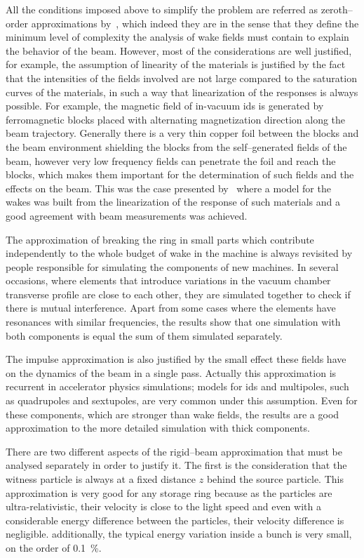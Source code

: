     All the conditions imposed above to simplify the problem are referred as zeroth--order approximations by~, which indeed they are in the sense that they define the minimum level of complexity the analysis of wake fields must contain to explain the behavior of the beam. However, most of the considerations are well justified, for example, the assumption of linearity of the materials is justified by the fact that the intensities of the fields involved are not large compared to the saturation curves of the materials, in such a way that linearization of the responses is always possible. For example, the magnetic field of in-vacuum \glspl{id} is generated by ferromagnetic blocks placed with alternating magnetization direction along the beam trajectory. Generally there is a very thin copper foil between the blocks and the beam environment shielding the blocks from the self--generated fields of the beam, however very low frequency fields can penetrate the foil and reach the blocks, which makes them important for the determination of such fields and the effects on the beam. This was the case presented by~ where a model for the wakes was built from the linearization of the response of such materials and a good agreement with beam measurements was achieved.

    The approximation of breaking the ring in small parts which contribute independently to the whole budget of wake in the machine is always revisited by people responsible for simulating the components of new machines. In several occasions, where elements that introduce variations in the vacuum chamber transverse profile are close to each other, they are simulated together to check if there is mutual interference. Apart from some cases where the elements have resonances with similar frequencies, the results show that one simulation with both components is equal the sum of them simulated separately.

    The impulse approximation is also justified by the small effect these fields have on the dynamics of the beam in a single pass. Actually this approximation is recurrent in accelerator physics simulations; models for \glspl{id} and multipoles, such as quadrupoles and sextupoles, are very common under this assumption. Even for these components, which are stronger than wake fields, the results are a good approximation to the more detailed simulation with thick components.

    There are two different aspects of the rigid--beam approximation that must be analysed separately in order to justify it. The first is the consideration that the witness particle is always at a fixed distance $z$ behind the source particle. This approximation is very good for any storage ring because as the particles are ultra-relativistic, their velocity is close to the light speed and even with a considerable energy difference between the particles, their velocity difference is negligible. additionally, the typical energy variation inside a bunch is very small, on the order of \SI{0.1}{\percent}.

